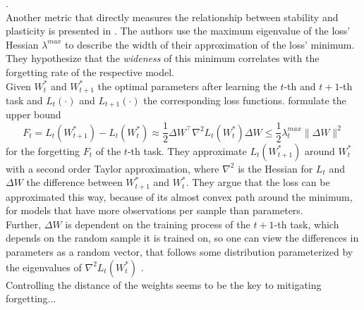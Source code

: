 \cite{díazrodríguez2018dontforgetforgettingnew}.\\
Another metric that directly measures the relationship between stability and plasticity is presented in \cite{mirzadeh2020understandingroletrainingregimes}. The authors use the maximum eigenvalue of the loss' Hessian $\lambda^{max}$ to describe the width of their approximation of the loss' minimum. They hypothesize that the \textit{wideness} of this minimum correlates with the forgetting rate of the respective model.\\
Given $W_t^*$ and $W_{t+1}^*$ the optimal parameters after learning the $t$-th and $t+1$-th task and $L_t(\cdot)$ and $L_{t+1}(\cdot)$ the corresponding loss functions. \citeauthor{mirzadeh2020understandingroletrainingregimes} formulate the upper bound
\begin{equation}
	F_t = L_t(W_{t+1}^*) - L_t(W_t^*) \approx \frac{1}{2}{\Delta W}^\top \nabla^2 L_t(W_t^*) \Delta W \leq \frac{1}{2}\lambda_t^{max}\lVert \Delta W \rVert^2
\end{equation}
for the forgetting $F_t$ of the $t$-th task. They approximate $L_t(W_{t+1}^*)$ around $W_t^*$ with a second order Taylor approximation, where $\nabla^2$ is the Hessian for $L_t$ and $\Delta W$ the difference between $W_{t+1}^*$ and $W_t^*$. They argue that the loss can be approximated this way, because of its almost convex path around the minimum, for models that have more observations per sample than parameters.\\
Further, ${\Delta W}$ is dependent on the training process of the $t+1$-th task, which depends on the random sample it is trained on, so one can view the differences in parameters as a random vector, that follows some distribution parameterized by the eigenvalues of $\nabla^2 L_t(W_t^*)$ \cite{mirzadeh2020understandingroletrainingregimes}.\\

Controlling the distance of the weights seems to be the key to mitigating forgetting...
